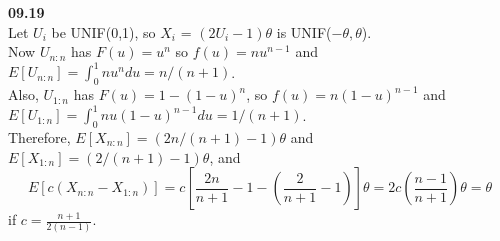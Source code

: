 {\bf 09.19}\\
Let $U_{i}$ be UNIF(0,1), so $X_{i}$ = $(2U_{i}-1)\theta$ is UNIF($-\theta,\theta$).\\ 
Now $U_{n:n}$ has $F(u) = u^n$ so $f(u) = nu^{n-1}$ and $E[U_{n:n}] = \int_{0}^{1}nu^{n}du = n/(n+1)$.\\ 
Also, $U_{1:n}$ has $F(u) = 1-(1-u)^n$, so $f(u) = n(1-u)^{n-1}$ and $E[U_{1:n}] = \int_{0}^{1}nu(1-u)^{n-1}du = 1/(n+1)$.\\
Therefore, $E[X_{n:n}] = (2n/(n+1) - 1)\theta$ and $E[X_{1:n}] = (2/(n+1) - 1)\theta$, and\\
$$E[c(X_{n:n} - X_{1:n})] = c[\frac{2n}{n+1} - 1 - (\frac{2}{n+1}-1)]\theta = 2c(\frac{n-1}{n+1})\theta = \theta$$ if $c = \frac{n+1}{2(n-1)}$.\\
